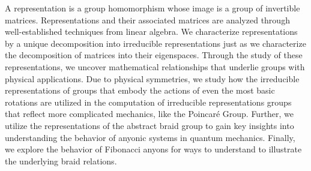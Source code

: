 A representation is a group homomorphism whose image is a group of invertible matrices. Representations and their associated matrices are analyzed through well-established techniques from linear algebra. We characterize representations by a unique decomposition into irreducible representations just as we characterize the decomposition of matrices into their eigenspaces. Through the study of these representations, we uncover mathematical relationships that underlie groups with physical applications. Due to physical symmetries, we study how the irreducible representations of groups that embody the actions of even the most basic rotations are utilized in the computation of irreducible representations groups that reflect more complicated mechanics, like the Poincar\'e Group. Further, we utilize the representations of the abstract braid group to gain key insights into understanding the behavior of anyonic systems in quantum mechanics. Finally, we explore the behavior of Fibonacci anyons for ways to understand to illustrate the underlying braid relations.